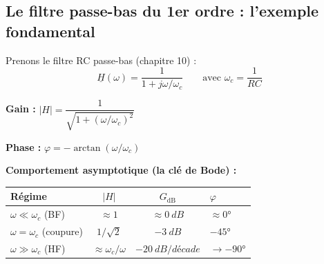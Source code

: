 \documentclass[12pt,a4paper,twoside]{book}
\begin{document}
\subsection{Le filtre passe-bas du 1er ordre : l'exemple fondamental}

Prenons le filtre RC passe-bas (chapitre 10) :
\[
\underline{H}(\omega) = \frac{1}{1 + j\omega/\omega_c} \qquad \text{avec } \omega_c = \frac{1}{RC}
\]

\textbf{Gain :} $|H| = \dfrac{1}{\sqrt{1 + (\omega/\omega_c)^2}}$

\textbf{Phase :} $\varphi = -\arctan(\omega/\omega_c)$

\textbf{Comportement asymptotique (la clé de Bode) :}

\begin{center}
\renewcommand{\arraystretch}{1.5}
\begin{tabular}{lccl}
\toprule
\textbf{Régime} & $|H|$ & $G_{\text{dB}}$ & $\varphi$ \\
\midrule
$\omega \ll \omega_c$ (BF) & $\approx 1$ & $\approx \SI{0}{dB}$ & $\approx 0°$ \\
$\omega = \omega_c$ (coupure) & $1/\sqrt{2}$ & $\SI{-3}{dB}$ & $-45°$ \\
$\omega \gg \omega_c$ (HF) & $\approx \omega_c/\omega$ & $-\SI{20}{dB/décade}$ & $\to -90°$ \\
\bottomrule
\end{tabular}
\end{center}
\end{document}
